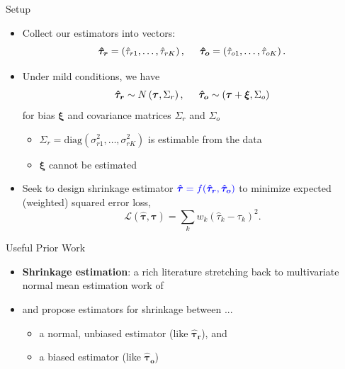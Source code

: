 \documentclass[usenames,dvipsnames]{beamer}
\newcommand{\bstau}{\boldsymbol{\tau}}
\newcommand{\hbstau}{\boldsymbol{\hat \tau}}
\newcommand{\htaur}{\boldsymbol{\hat \tau_r}}
\newcommand{\htauo}{\boldsymbol{\hat \tau_o}}
\let\oldcite=\cite
\renewcommand{\cite}[1]{\textcolor[rgb]{.3,.3,.8}{\oldcite{#1}}}
\theoremstyle{definition} %
\begin{document}
\begin{frame}{Setup}
\begin{itemize}
\item Collect our estimators into vectors:
\[\boldsymbol{\hat \tau_r }= \left(\hat \tau_{r1}, \dots, \hat \tau_{rK} \right), \hspace{5mm}   \boldsymbol{\hat \tau_{o}} = \left(\hat \tau_{o1}, \dots, \hat \tau_{oK} \right). \] \pause
\item Under mild conditions, we have 
\[ \boldsymbol{\hat \tau_{r}} \sim N\left( \boldsymbol{\tau}, \Sigma_r \right) , \hspace{5mm}  \boldsymbol{\hat \tau_{o}} \sim \left( \boldsymbol{\tau} + \boldsymbol{\xi}, \Sigma_o \right) \] 
for bias $\boldsymbol{\xi}$ and covariance matrices $\Sigma_r$ and $\Sigma_o$
\begin{itemize}
\item $\Sigma_r = \text{diag}(\sigma_{r1}^2, \dots, \sigma_{rK}^2)$ is estimable from the data 
\item $\boldsymbol{\xi}$ cannot be estimated
\end{itemize} \pause
\item Seek to design shrinkage estimator $\color{blue} \hbstau = f(\boldsymbol{\hat \tau_r },  \boldsymbol{\hat \tau_{o}})\color{black}$ to minimize expected (weighted) squared error loss,
\[ \mathcal{L}(\hbstau, \bstau) =  \sum_k w_k \left( \hat \tau_k - \tau_k \right)^2. \] 
\end{itemize}
\end{frame}


\begin{frame}{Useful Prior Work}
\begin{itemize}
\item \textbf{Shrinkage estimation}: a rich literature stretching back to multivariate normal mean estimation work of \cite{stein1956inadmissibility}
\item \cite{green1991james} and \cite{green2005improved} propose estimators for shrinkage between ... 
\begin{itemize}
\item a normal, unbiased estimator (like $\htaur$), and 
\item a biased estimator (like $\htauo$)
\end{itemize}
\vspace{3mm}
\end{itemize}
\end{frame}
\end{document}
